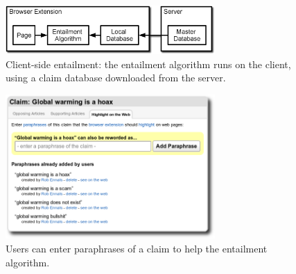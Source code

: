 \documentclass{www2010-submission}
\begin{document}
\begin{figure}[t]
	\begin{center}
	\includegraphics[width=8cm]{pictures/nlp_client_server2.png}
	\caption{Client-side entailment: the entailment algorithm runs on the client, using a claim database downloaded from the server.}
	\label{nlp_client_server}
	\end{center}
\end{figure}

\begin{figure}[tb]
	\begin{center}
	\includegraphics[width=8cm]{pictures/paraphrases.png}
	\caption{Users can enter paraphrases of a claim to help the entailment algorithm.}
	\label{paraphrases}
	\end{center}
\end{figure}
\end{document}
